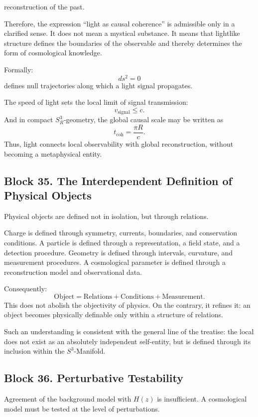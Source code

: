 \documentclass[12pt,a4paper]{article}
\theoremstyle{definition}
\begin{document}
reconstruction of the past.

Therefore, the expression ``light as causal coherence'' is admissible only in a clarified sense. It does not mean a mystical substance. It means that lightlike structure defines the boundaries of the observable and thereby determines the form of cosmological knowledge.

Formally:
\[
ds^2=0
\]
defines null trajectories along which a light signal propagates.

The speed of light sets the local limit of signal transmission:
\[
v_{\mathrm{signal}}\leq c.
\]
And in compact \(S^3_R\)-geometry, the global causal scale may be written as
\[
t_{\mathrm{coh}}=\frac{\pi R}{c}.
\]
Thus, light connects local observability with global reconstruction, without becoming a metaphysical entity.



\subsection{Block 35. The Interdependent Definition of Physical Objects}
Physical objects are defined not in isolation, but through relations.

Charge is defined through symmetry, currents, boundaries, and conservation conditions. A particle is defined through a representation, a field state, and a detection procedure. Geometry is defined through intervals, curvature, and measurement procedures. A cosmological parameter is defined through a reconstruction model and observational data.

Consequently:
\[
\mathrm{Object}
=
\mathrm{Relations}
+
\mathrm{Conditions}
+
\mathrm{Measurement}.
\]
This does not abolish the objectivity of physics. On the contrary, it refines it: an object becomes physically definable only within a structure of relations.

Such an understanding is consistent with the general line of the treatise: the local does not exist as an absolutely independent self-entity, but is defined through its inclusion within the \(S^3\)-Manifold.



\subsection{Block 36. Perturbative Testability}
Agreement of the background model with $H(z)$ is insufficient. A cosmological model must be tested at the level of perturbations.
\end{document}
